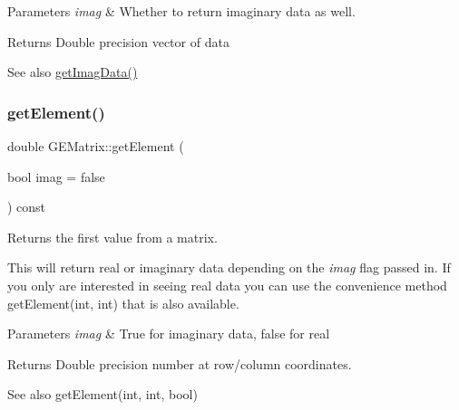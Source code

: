 \begin{DoxyParams}{Parameters}
{\em imag} & Whether to return imaginary data as well.\\
\hline
\end{DoxyParams}
\begin{DoxyReturn}{Returns}
Double precision vector of data
\end{DoxyReturn}
\begin{DoxySeeAlso}{See also}
\hyperlink{class_g_e_matrix_a7610a3e67e0729c3a1d4ae5648d2aae5}{get\+Imag\+Data()} 
\end{DoxySeeAlso}
\mbox{\label{class_g_e_matrix_a88c636c028a0cd12eb8ed77e33a1b86e}} 
\subsubsection{\texorpdfstring{get\+Element()}{getElement()}\hspace{0.1cm}{\footnotesize\ttfamily [1/3]}}
{\footnotesize\ttfamily double G\+E\+Matrix\+::get\+Element (\begin{DoxyParamCaption}\item[{bool}]{imag = {\ttfamily false} }\end{DoxyParamCaption}) const}



Returns the first value from a matrix. 

This will return real or imaginary data depending on the {\itshape imag} flag passed in. If you only are interested in seeing real data you can use the convenience method get\+Element(int, int) that is also available.


\begin{DoxyParams}{Parameters}
{\em imag} & True for imaginary data, false for real \\
\hline
\end{DoxyParams}
\begin{DoxyReturn}{Returns}
Double precision number at row/column coordinates.
\end{DoxyReturn}
\begin{DoxySeeAlso}{See also}
get\+Element(int, int, bool) 
\end{DoxySeeAlso}
\mbox{\label{class_g_e_matrix_a3a02dfd155c17ae41aafdd0907367bb7}} 
